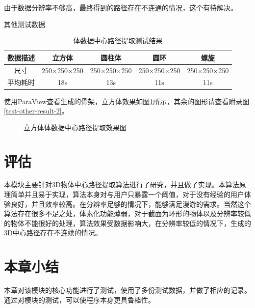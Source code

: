 由于数据分辨率不够高，最终得到的路径存在不连通的情况，这个有待解决。

其他测试数据
\begin{table}
    \centering
    \caption{体数据中心路径提取测试结果}
    \label{test-other}
    \begin{tabular}{c|c|c|c|c}
        \hline
        数据描述 & 立方体      & 圆柱体       & 圆环        & 螺旋 \\ \hline
        尺寸     & 250×250×250 & 250×250×250 & 250×250×250 & 250×250×250 \\ \hline
        平均耗时 & 18s        &  13s         & 11s         & 11s \\ \hline
    \end{tabular}
\end{table}

使用ParaView查看生成的骨架，立方体效果如图\ref{test-other-result-1}所示，其余的图形请查看附录图\ref{test-other-result-2}。
\begin{figure}[h!]
    \centering
    \hspace{2em} %
    \caption{立方体体数据中心路径提取效果图}
    \label{test-other-result-1}
\end{figure}

\section{评估}
本模块主要针对3D物体中心路径提取算法进行了研究，并且做了实现。本算法原理简单并且易于实现，算法本身对与用户只暴露一个阈值，对于没有经验的用户体验良好，并且效率较高。在分辨率足够的情况下，能够满足漫游的需求。当然这个算法存在很多不足之处，体素化功能薄弱，对于截面为环形的物体以及分辨率较低的物体不能很好的处理，算法效果受数据影响大，在分辨率较低的情况下，生成的3D中心路径存在不连续的情况。

\section{本章小结}
本章对该模块的核心功能进行了测试，使用了多份测试数据，并做了相应的记录。通过对模块的测试，可以使程序本身更具鲁棒性。
